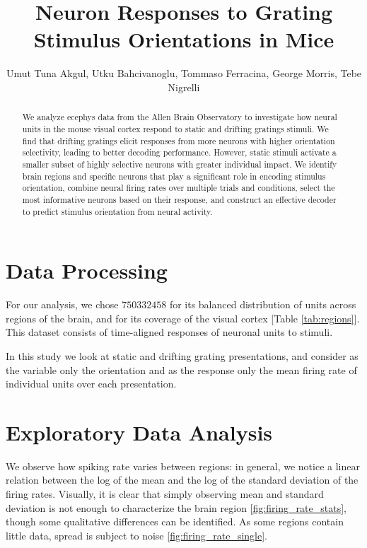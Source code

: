 \documentclass[10pt,twocolumn]{article}
\title{\Large \textbf{Neuron Responses to Grating Stimulus Orientations in Mice}}
\author{
  Umut Tuna Akgul, Utku Bahcivanoglu, Tommaso Ferracina, George Morris, Tebe Nigrelli
}
\begin{document}
\maketitle

\begin{abstract}
We analyze ecephys data from the Allen Brain Observatory to investigate how neural units in the mouse visual cortex respond to static and drifting gratings stimuli. We find that drifting gratings elicit responses from more neurons with higher orientation selectivity, leading to better decoding performance. However, static stimuli activate a smaller subset of highly selective neurons with greater individual impact. We identify brain regions and specific neurons that play a significant role in encoding stimulus orientation, combine neural firing rates over multiple trials and conditions, select the most informative neurons based on their response, and construct an effective decoder to predict stimulus orientation from neural activity.
\end{abstract}


\section{Data Processing}

For our analysis, we chose $750332458$ for its balanced distribution of units across regions of the brain, and for its coverage of the visual cortex [Table \ref{tab:regions}].  This dataset consists of time-aligned responses of neuronal units to stimuli.

In this study we look at static and drifting grating presentations, and consider as the variable only the orientation and as the response only the mean firing rate of individual units over each presentation.

\section{Exploratory Data Analysis}

We observe how spiking rate varies between regions: in general, we notice a linear relation between the log of the mean and the log of the standard deviation of the firing rates. Visually, it is clear that simply observing mean and standard deviation is not enough to characterize the brain region \ref{fig:firing_rate_stats}, though some qualitative differences can be identified. As some regions contain little data, spread is subject to noise \ref{fig:firing_rate_single}.
\end{document}

